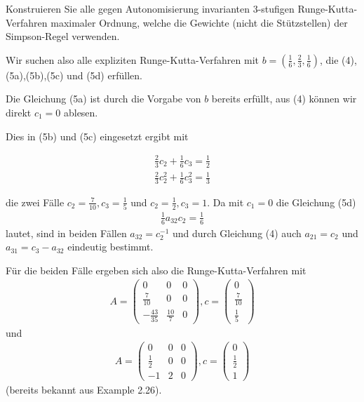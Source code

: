 \begin{exercise}

Konstruieren Sie alle gegen Autonomisierung invarianten 3-stufigen Runge-Kutta-Verfahren maximaler Ordnung, welche die Gewichte (nicht die Stützstellen) der Simpson-Regel verwenden.

\end{exercise}

\begin{solution}

Wir suchen also alle expliziten Runge-Kutta-Verfahren mit $b = (\frac{1}{6},\frac{2}{3},\frac{1}{6})$, die (4),(5a),(5b),(5c) und (5d) erfüllen.

Die Gleichung (5a) ist durch die Vorgabe von $b$ bereits erfüllt, aus (4) können wir direkt $c_{1}=0$ ablesen.

Dies in (5b) und (5c) eingesetzt ergibt mit

\begin{align*}
    \frac{2}{3}c_{2} + \frac{1}{6}c_{3} = \frac{1}{2} \\
    \frac{2}{3}c_{2}^{2} + \frac{1}{6}c_{3}^{2} = \frac{1}{3}
\end{align*}

die zwei Fälle $c_{2}=\frac{7}{10}, c_{3}=\frac{1}{5}$ und $c_{2}=\frac{1}{2}, c_{3}=1$.
Da mit $c_{1}=0$ die Gleichung (5d)
\begin{align*}
    \frac{1}{6}a_{32}c_{2}=\frac{1}{6}
\end{align*}
lautet, sind in beiden Fällen $a_{32}=c_{2}^{-1}$ und durch Gleichung (4) auch $a_{21}=c_{2}$ und $a_{31}=c_{3}-a_{32}$ eindeutig bestimmt.

Für die beiden Fälle ergeben sich also die Runge-Kutta-Verfahren mit
\begin{align*}
    A = \left( \begin{array}{rrr}
         0 & 0 & 0 \\
        \frac{7}{10} & 0 & 0 \\
        -\frac{43}{35} & \frac{10}{7} & 0
    \end{array} \right) , c = \begin{pmatrix}
    0 \\ \frac{7}{10} \\ \frac{1}{5}
    \end{pmatrix}
\end{align*}
und
\begin{align*}
    A = \left( \begin{array}{rrr}
         0 & 0 & 0 \\
        \frac{1}{2} & 0 & 0 \\
        -1 & 2 & 0
    \end{array} \right) , c = \begin{pmatrix}
    0 \\ \frac{1}{2} \\ 1
    \end{pmatrix}
\end{align*}
(bereits bekannt aus Example 2.26).
\end{solution}
